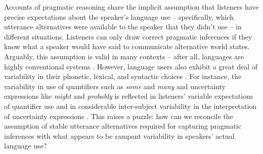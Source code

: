 \documentclass[man, floatsintext]{apa6}
\begin{document}
Accounts of pragmatic reasoning share the implicit assumption that listeners have precise expectations about the speaker's language use -- specifically, which utterance alternatives were available to the speaker that they didn't use -- in different situations. Listeners can only draw correct pragmatic inferences if they know what a speaker would have said to communicate alternative world states. Arguably, this assumption is valid in many contexts -- after all, languages are highly conventional systems \parencite{Lewis1969}. However, language users also exhibit a great deal of variability in their phonetic, lexical, and syntactic choices \parencite[e.g.,][]{Liberman1967,Weiner1983,Harrington2000,Finegan2001,Allen2003}. For instance, the variability in use of quantifiers such as \textit{some} and \textit{many} and uncertainty expressions like \textit{might} and \textit{probably} is reflected in listeners' variable expectations of quantifier use \textcite{Yildirim2016} and in considerable inter-subject variability in the interpretation of uncertainty expressions \textcite{Wallsten1986}. This raises a puzzle: how can we reconcile the assumption of stable utterance alternatives required for capturing pragmatic inferences with what appears to be rampant variability in speakers' actual language use?
\end{document}
